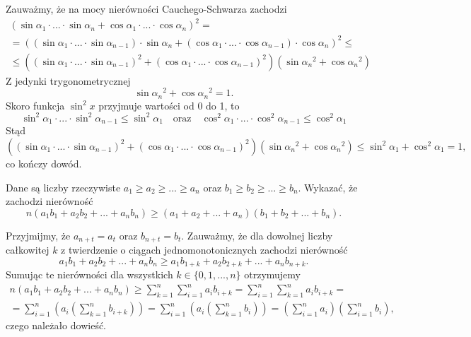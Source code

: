 \noindent
Zauważmy, że na mocy nierówności Cauchego-Schwarza zachodzi
\begin{gather*}
	\left(\sin{\alpha_1}\cdot ... \cdot \sin{\alpha_n} + \cos{\alpha_1}\cdot ... \cdot \cos{\alpha_n}\right)^2 = \\
	= \left((\sin{\alpha_1}\cdot ... \cdot \sin{\alpha_{n - 1}}) \cdot \sin{\alpha_n} + (\cos{\alpha_1}\cdot ... \cdot \cos{\alpha_{n - 1}}) \cdot \cos{\alpha_n}\right)^2 \leqslant \\
	\leqslant
	 \left((\sin{\alpha_1}\cdot ... \cdot \sin{\alpha_{n - 1}})^2+ (\cos{\alpha_1}\cdot ... \cdot \cos{\alpha_{n - 1}})^2\right) (\sin{\alpha_n}^2 + \cos{\alpha_n}^2)
\end{gather*}
Z jedynki trygonometrycznej
\[
	\sin{\alpha_n}^2 + \cos{\alpha_n}^2 = 1.
\]
Skoro funkcja $\sin^2{x}$ przyjmuje wartości od 0 do 1, to
\[
	\sin^2{\alpha_1} \cdot ... \cdot \sin^2{\alpha_{n - 1}} \leqslant \sin^2{\alpha_1}
	\quad \text{oraz} \quad
	\cos^2{\alpha_1} \cdot ... \cdot \cos^2{\alpha_{n - 1}} \leqslant \cos^2{\alpha_1}
\]
Stąd
\[
	\left((\sin{\alpha_1}\cdot ... \cdot \sin{\alpha_{n - 1}})^2+ (\cos{\alpha_1}\cdot ... \cdot \cos{\alpha_{n - 1}})^2\right) (\sin{\alpha_n}^2 + \cos{\alpha_n}^2) \leqslant \sin^2{\alpha_1} + \cos^2{\alpha_1} = 1,
\]
co kończy dowód.

\begin{problem}{4}
	Dane są liczby rzeczywiste $a_1 \geqslant a_2 \geqslant ... \geqslant a_n$ oraz $b_1 \geqslant b_2 \geqslant ... \geqslant b_n$. Wykazać, że zachodzi nierówność
	\[
		n(a_1b_1 + a_2b_2 + ... + a_nb_n) \geqslant (a_1 + a_2 + ... + a_n)(b_1 + b_2 + ... + b_n).
	\]
\end{problem}

\noindent
Przyjmijmy, że $a_{n + t} = a_{t}$ oraz $b_{n + t} = b_{t}$.
Zauważmy, że dla dowolnej liczby całkowitej $k$ z twierdzenie o ciągach jednomonotonicznych zachodzi nierówność
\[
	a_1b_1 + a_2b_2 + ... + a_nb_n \geqslant a_1b_{1 + k} + a_2b_{2 + k} + ... + a_nb_{n + k}.
\]
Sumując te nierówności dla wszystkich $k \in \{0, 1, ..., n\}$ otrzymujemy
\begin{align*}
	n(a_1b_1 + a_2b_2 + ... + a_nb_n) \geqslant 
	\sum^{n}_{k = 1} \sum^{n}_{i=1} a_ib_{i + k} 
	= \sum^{n}_{i = 1} \sum^{n}_{k=1} a_ib_{i + k} = \\
	= \sum^{n}_{i = 1} \left( a_i \left(\sum^{n}_{k=1} b_{i + k}\right) \right) 
	= \sum^{n}_{i = 1} \left( a_i \left(\sum^{n}_{k=1} b_{i}\right) \right) 
	= \left(\sum^{n}_{i = 1} a_i\right)\left(\sum^{n}_{i = 1} b_i\right),
\end{align*}
czego należało dowieść.

